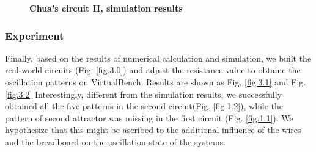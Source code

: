\documentclass[10pt,a4paper,twocolumn,twoside,UTF8]{article}
\begin{document}
			\begin{figure}[htbp]
				\centering

				\caption{\textbf{Chua's circuit II, simulation results}}
				\label{fig.2.2}
			\end{figure}
		
			\subsubsection{Experiment}
			Finally, based on the results of numerical calculation and simulation, we built the real-world circuits (Fig. \ref{fig.3.0})  
			and adjust the resistance value to obtaine the oscillation patterns on VirtualBench. Results are shown as Fig. \ref{fig.3.1} and Fig. \ref{fig.3.2}
			Interestingly, different from the simulation results, we successfully obtained all the five patterns in the second circuit(Fig. \ref{fig.1.2}),
			while the pattern of second attractor was missing in the first circuit (Fig. \ref{fig.1.1}).
			We hypothesize that this might be ascribed to the additional influence of the wires and the breadboard on the oscillation state of the systems.
			
\end{document}

